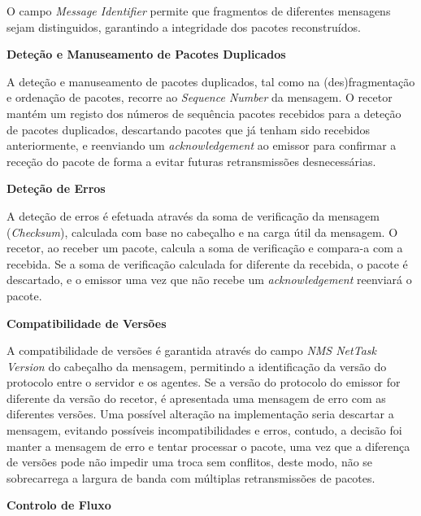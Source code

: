 \documentclass[a4paper,12pt]{scrreprt}
\begin{document}
O campo \textit{Message Identifier} permite que fragmentos de diferentes mensagens
sejam distinguidos, garantindo a integridade dos pacotes reconstruídos.


\clearpage

\textbf{Deteção e Manuseamento de Pacotes Duplicados}

A deteção e manuseamento de pacotes duplicados, tal como na (des)fragmentação
e ordenação de pacotes, recorre ao \textit{Sequence Number} da mensagem.
O recetor mantém um registo dos números de sequência pacotes recebidos para a
deteção de pacotes duplicados, descartando pacotes que já tenham sido recebidos anteriormente, e
reenviando um \textit{acknowledgement} ao emissor para confirmar a receção do pacote
de forma a evitar futuras retransmissões desnecessárias.


\textbf{Deteção de Erros}

A deteção de erros é efetuada através da soma de verificação da mensagem (\textit{Checksum}),
calculada com base no cabeçalho e na carga útil da mensagem. O recetor, ao receber
um pacote, calcula a soma de verificação e compara-a com a recebida. Se a soma de
verificação calculada for diferente da recebida, o pacote é descartado, e o emissor
uma vez que não recebe um \textit{acknowledgement} reenviará o pacote.


\textbf{Compatibilidade de Versões}

A compatibilidade de versões é garantida através do campo \textit{NMS NetTask Version} do cabeçalho
da mensagem, permitindo a identificação da versão do protocolo entre o servidor e os agentes. Se a
versão do protocolo do emissor for diferente da versão do recetor, é apresentada uma mensagem de erro
com as diferentes versões. Uma possível alteração na implementação seria descartar a mensagem, evitando
possíveis incompatibilidades e erros, contudo, a decisão foi manter a mensagem de erro e tentar processar
o pacote, uma vez que a diferença de versões pode não impedir uma troca sem conflitos, deste modo, não
se sobrecarrega a largura de banda com múltiplas retransmissões de pacotes.


\textbf{Controlo de Fluxo}
\end{document}
